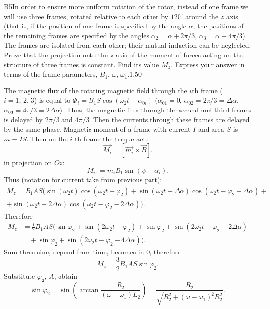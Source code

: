 \documentclass[11pt,a4paper]{article}
\begin{document}
\begin{solcard}{B5}{In order to ensure more uniform rotation of the rotor, instead of one frame we will use three frames, rotated relative to each other by $120^\circ$ around the $z$ axis (that is, if the position of one frame is specified by the angle $\alpha$, the positions of the remaining frames are specified by the angles $\alpha_2 = \alpha + 2\pi/3$, $\alpha_3 = \alpha + 4\pi/3$). The frames are isolated from each other; their mutual induction can be neglected. Prove that the projection onto the $z$ axis of the moment of forces acting on the structure of three frames is constant. Find its value $M_z$. Express your answer in terms of the frame parameters, $B_1$, $\omega$, $\omega_1$.}{1.50}

The magnetic flux of the rotating magnetic field through the $i$th frame ($i = 1,\, 2,\, 3$) is equal to $\Phi_i = B_1 S \cos (\omega_2 t - \alpha_{0i})$ ($\alpha _{01} = 0$, $\alpha_{02} = 2\pi/3 = \Delta \alpha$, $\alpha_{03} = 4\pi/3 = 2 \Delta \alpha$). Thus, the magnetic flux through the second and third frames is delayed by $2\pi/3$ and $4 \pi/3$. Then the currents through these frames are delayed by the same phase. Magnetic moment of a frame with current $I$ and area $S$ is $m = IS$. Then on the $i$-th frame the torque acts $$\vec{M_i} = [\vec{m_i} \times \vec {B}]. $$ in projection on $Oz$: $$ M_{iz} = m_iB_1\sin(\psi - \alpha_i). $$ Thus (notation for current take from previous part): $$\begin{aligned} M_z =B_1AS(\sin(\omega_2 t)\cos(\omega_2 t - \varphi_2) + \sin(\omega_2 t-\Delta\alpha)\cos(\omega_2 t - \varphi_2-\Delta\alpha) + \\
 + \sin(\omega_2 t-2\Delta\alpha)\cos(\omega_2 t - \varphi_2 - 2\Delta\alpha)). \end{aligned}$$ Therefore $$\begin{aligned} M_z &= \frac{1}{2}B_1AS\bigl(\sin\varphi_2 + \sin(2\omega_2 t - \varphi_2) + \sin\varphi_2 + \sin(2\omega_2 t - \varphi_2 - 2\Delta\alpha) \\&\quad + \sin\varphi_2 + \sin(2\omega_2 t - \varphi_2 - 4\Delta\alpha)\bigr). \end{aligned}$$ Sum three sine, depend from time, becomes in 0, therefore $$ M_z= \frac{3}{2}B_1AS\sin \varphi_2. $$ Substitute $\varphi_2$, $A$, obtain $$ \sin \varphi_2 = \sin \left( \arctan \frac{R_2}{(\omega - \omega_1)L_2}\right) = \frac{R_2}{\sqrt{R_2^2 + (\omega- \omega_1)^2 R_2^2}}. $$



\end{solcard}
\end{document}
